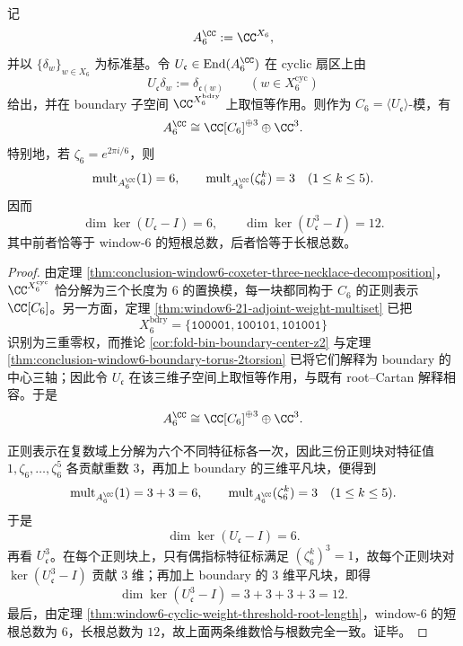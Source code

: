 \begin{theorem}\label{thm:conclusion-window6-coxeter-spectrum-root-count-recovery}
记
\[
A_6^{\CC}:=\CC^{X_6},
\]
并以 \(\{\delta_w\}_{w\in X_6}\) 为标准基。令 \(U_{\mathfrak c}\in \operatorname{End}(A_6^{\CC})\) 在 cyclic 扇区上由
\[
U_{\mathfrak c}\delta_w:=\delta_{\mathfrak c(w)}
\qquad (w\in X_6^{\mathrm{cyc}})
\]
给出，并在 boundary 子空间 \(\CC^{X_6^{\mathrm{bdry}}}\) 上取恒等作用。则作为 \(C_6=\langle U_{\mathfrak c}\rangle\)-模，有
\[
A_6^{\CC}\cong \CC[C_6]^{\oplus 3}\oplus \CC^3.
\]
特别地，若 \(\zeta_6=e^{2\pi i/6}\)，则
\[
\operatorname{mult}_{A_6^{\CC}}(1)=6,\qquad
\operatorname{mult}_{A_6^{\CC}}(\zeta_6^k)=3\quad (1\le k\le 5).
\]
因而
\[
\dim\ker(U_{\mathfrak c}-I)=6,\qquad
\dim\ker(U_{\mathfrak c}^3-I)=12.
\]
其中前者恰等于 window-\(6\) 的短根总数，后者恰等于长根总数。
\end{theorem}
\begin{proof}
由定理 \ref{thm:conclusion-window6-coxeter-three-necklace-decomposition}，\(\CC^{X_6^{\mathrm{cyc}}}\) 恰分解为三个长度为 \(6\) 的置换模，每一块都同构于 \(C_6\) 的正则表示 \(\CC[C_6]\)。另一方面，定理 \ref{thm:window6-21-adjoint-weight-multiset} 已把
\[
X_6^{\mathrm{bdry}}=\{\texttt{100001},\texttt{100101},\texttt{101001}\}
\]
识别为三重零权，而推论 \ref{cor:fold-bin-boundary-center-z2} 与定理 \ref{thm:conclusion-window6-boundary-torus-2torsion} 已将它们解释为 boundary 的中心三轴；因此令 \(U_{\mathfrak c}\) 在该三维子空间上取恒等作用，与既有 root--Cartan 解释相容。于是
\[
A_6^{\CC}\cong \CC[C_6]^{\oplus 3}\oplus \CC^3.
\]

正则表示在复数域上分解为六个不同特征标各一次，因此三份正则块对特征值 \(1,\zeta_6,\dots,\zeta_6^5\) 各贡献重数 \(3\)，再加上 boundary 的三维平凡块，便得到
\[
\operatorname{mult}_{A_6^{\CC}}(1)=3+3=6,\qquad
\operatorname{mult}_{A_6^{\CC}}(\zeta_6^k)=3\quad (1\le k\le 5).
\]
于是
\[
\dim\ker(U_{\mathfrak c}-I)=6.
\]
再看 \(U_{\mathfrak c}^3\)。在每个正则块上，只有偶指标特征标满足 \((\zeta_6^k)^3=1\)，故每个正则块对 \(\ker(U_{\mathfrak c}^3-I)\) 贡献 \(3\) 维；再加上 boundary 的 \(3\) 维平凡块，即得
\[
\dim\ker(U_{\mathfrak c}^3-I)=3+3+3+3=12.
\]
最后，由定理 \ref{thm:window6-cyclic-weight-threshold-root-length}，window-\(6\) 的短根总数为 \(6\)，长根总数为 \(12\)，故上面两条维数恰与根数完全一致。证毕。
\end{proof}


